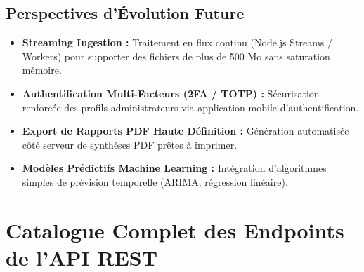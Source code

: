 \documentclass[11pt,a4paper]{article}
\begin{document}
\subsection{Perspectives d'Évolution Future}
\begin{itemize}[leftmargin=1.5cm, label=\textcolor{brandblue}{\textbullet}]
    \item \textbf{Streaming Ingestion :} Traitement en flux continu (Node.js Streams / Workers) pour supporter des fichiers de plus de 500 Mo sans saturation mémoire.
    \item \textbf{Authentification Multi-Facteurs (2FA / TOTP) :} Sécurisation renforcée des profils administrateurs via application mobile d'authentification.
    \item \textbf{Export de Rapports PDF Haute Définition :} Génération automatisée côté serveur de synthèses PDF prêtes à imprimer.
    \item \textbf{Modèles Prédictifs Machine Learning :} Intégration d'algorithmes simples de prévision temporelle (ARIMA, régression linéaire).
\end{itemize}

\appendix
\section{Catalogue Complet des Endpoints de l'API REST}
\end{document}
